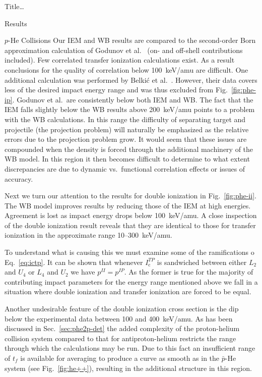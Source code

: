 \documentclass[letterpaper, 11 pt]{report}
\begin{document}
\begin{chapter}{ Title\dots \label{chap:p-he2p-he}}
\begin{section}{Results \label{sec:phe2p-res}}
\begin{subsection}{\texorpdfstring{$p$}{p}-He Collisions \label{sec:phe-res}}
         Our IEM and WB results are compared to the second-order Born approximation calculation of
         Godunov et al.~\cite{Godunov-06} (on- and off-shell contributions included). Few
         correlated transfer ionization calculations exist. As a result conclusions for the quality of
         correlation below 100~keV/amu are difficult. One additional calculation was performed by
         Belki\'{c} et al.~\cite{BM-11}. However, their data covers less of the desired impact
         energy range and was thus excluded from Fig.~\ref{fig:phe-ip}. Godunov et al.\ are
         consistently below both IEM and WB. The fact that the IEM falls slightly below the WB results
         above 200~keV/amu points to a problem with the WB calculations. In this range the difficulty of
         separating target and projectile (the projection problem) will naturally be emphasized as the
         relative errors due to the projection problem grow. It would seem that these issues are
         compounded when the density is forced through the additional machinery of the WB model. In this
         region it then becomes difficult to determine to what extent discrepancies are due to dynamic
         vs.\ functional correlation effects or issues of accuracy.

         Next we turn our attention to the results for double ionization in Fig.~\ref{fig:phe-ii}. The
         WB model improves results by reducing those of the IEM at high energies. Agreement is lost as
         impact energy drops below 100~keV/amu. A close inspection of the double ionization result
         reveals that they are identical to those for transfer ionization in the approximate range
         10--300~keV/amu.
         
         To understand what is causing this we must examine some of the ramifications o
         Eq.~\eqref{eq:ictp}. It can be shown that whenever $I^{TP}_\mathrm{c}$ is sandwiched between
         either $L_2$ and $U_4$ or $L_4$ and $U_2$ we have $p^{II} = p^{IP}$. As the former is true for
         the majority of contributing impact parameters for the energy range mentioned above we fall in
         a situation where double ionization and transfer ionization are forced to be equal.

         Another undesirable feature of the double ionization cross section is the dip below the
         experimental data between 100 and 400~keV/amu. As has been discussed in
         Sec.~\ref{sec:phe2p-det} the added complexity of the proton-helium collision system compared to
         that for antiproton-helium restricts the range through which the calculations may be run. Due
         to this fact an insufficient range of $t_f$ is available for averaging to produce a curve as
         smooth as in the $\bar{p}$-He system (see Fig.~\ref{fig:he++}), resulting in the additional
         structure in this region.
        

\end{subsection}
\end{section}
\end{chapter}
\end{document}
